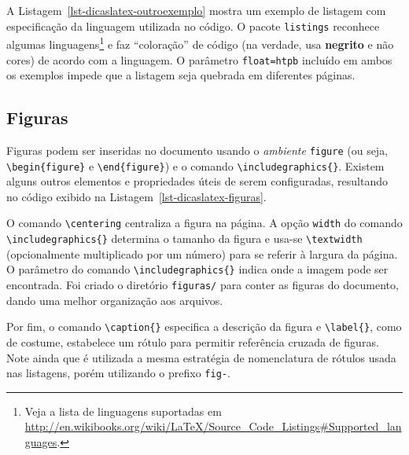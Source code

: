 

A Listagem~\ref{lst-dicaslatex-outroexemplo} mostra um exemplo de listagem com especificação da linguagem utilizada no código. O pacote \texttt{listings} reconhece algumas linguagens\footnote{Veja a lista de linguagens suportadas em \url{http://en.wikibooks.org/wiki/LaTeX/Source\_Code\_Listings\#Supported_languages}.} e faz ``coloração'' de código (na verdade, usa \textbf{negrito} e não cores) de acordo com a linguagem. O parâmetro \texttt{float=htpb} incluído em ambos os exemplos impede que a listagem seja quebrada em diferentes páginas.





\subsection{Figuras}
\label{sec-dicaslatex-figuras}

Figuras podem ser inseridas no documento usando o \emph{ambiente} \texttt{figure} (ou seja, \texttt{\textbackslash begin\{figure\}} e \texttt{\textbackslash end\{figure\}}) e o comando \texttt{\textbackslash includegraphics\{\}}. Existem alguns outros elementos e propriedades úteis de serem configuradas, resultando no código exibido na Listagem~\ref{lst-dicaslatex-figuras}.



O comando \texttt{\textbackslash centering} centraliza a figura na página. A opção \texttt{width} do comando \texttt{\textbackslash includegraphics\{\}} determina o tamanho da figura e usa-se \texttt{\textbackslash textwidth} (opcionalmente multiplicado por um número) para se referir à largura da página. O parâmetro do comando \texttt{\textbackslash includegraphics\{\}} indica onde a imagem pode ser encontrada. Foi criado o diretório \texttt{figuras/} para conter as figuras do documento, dando uma melhor organização aos arquivos.

Por fim, o comando \texttt{\textbackslash caption\{\}} especifica a descrição da figura e \texttt{\textbackslash label\{\}}, como de costume, estabelece um rótulo para permitir referência cruzada de figuras. Note ainda que é utilizada a mesma estratégia de nomenclatura de rótulos usada nas listagens, porém utilizando o prefixo \texttt{fig-}.

